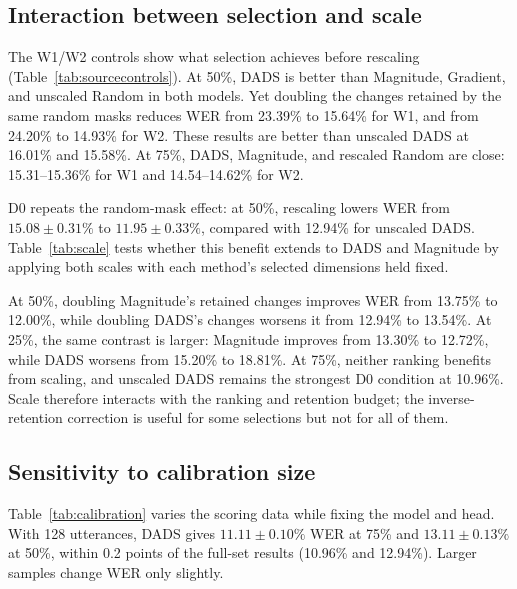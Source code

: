\documentclass{article}
\begin{document}
\subsection{Interaction between selection and scale}
The W1/W2 controls show what selection achieves before rescaling (Table~\ref{tab:sourcecontrols}). At 50\%, DADS is better than Magnitude, Gradient, and unscaled Random in both models. Yet doubling the changes retained by the same random masks reduces WER from 23.39\% to 15.64\% for W1, and from 24.20\% to 14.93\% for W2. These results are better than unscaled DADS at 16.01\% and 15.58\%. At 75\%, DADS, Magnitude, and rescaled Random are close: 15.31--15.36\% for W1 and 14.54--14.62\% for W2.

\begin{table}[t]
\centering
\caption{W1/W2 test WER (\%) at 50\% retention. Random results are mean $\pm$ SD over three masks, reused for rescaling. Bold marks the lowest mean WER in each column.}
\label{tab:sourcecontrols}
\setlength{\tabcolsep}{4pt}

\end{table}

D0 repeats the random-mask effect: at 50\%, rescaling lowers WER from $15.08\pm0.31\%$ to $11.95\pm0.33\%$, compared with 12.94\% for unscaled DADS. Table~\ref{tab:scale} tests whether this benefit extends to DADS and Magnitude by applying both scales with each method's selected dimensions held fixed.

\begin{table}[t]
\centering
\caption{D0 test WER (\%) with the same two prespecified scales applied to each ranking. Bold marks the lowest WER at each budget.}
\label{tab:scale}

\end{table}

At 50\%, doubling Magnitude's retained changes improves WER from 13.75\% to 12.00\%, while doubling DADS's changes worsens it from 12.94\% to 13.54\%. At 25\%, the same contrast is larger: Magnitude improves from 13.30\% to 12.72\%, while DADS worsens from 15.20\% to 18.81\%. At 75\%, neither ranking benefits from scaling, and unscaled DADS remains the strongest D0 condition at 10.96\%. Scale therefore interacts with the ranking and retention budget; the inverse-retention correction is useful for some selections but not for all of them.

\subsection{Sensitivity to calibration size}
Table~\ref{tab:calibration} varies the scoring data while fixing the model and head. With 128 utterances, DADS gives $11.11\pm0.10\%$ WER at 75\% and $13.11\pm0.13\%$ at 50\%, within 0.2 points of the full-set results (10.96\% and 12.94\%). Larger samples change WER only slightly.
\end{document}
